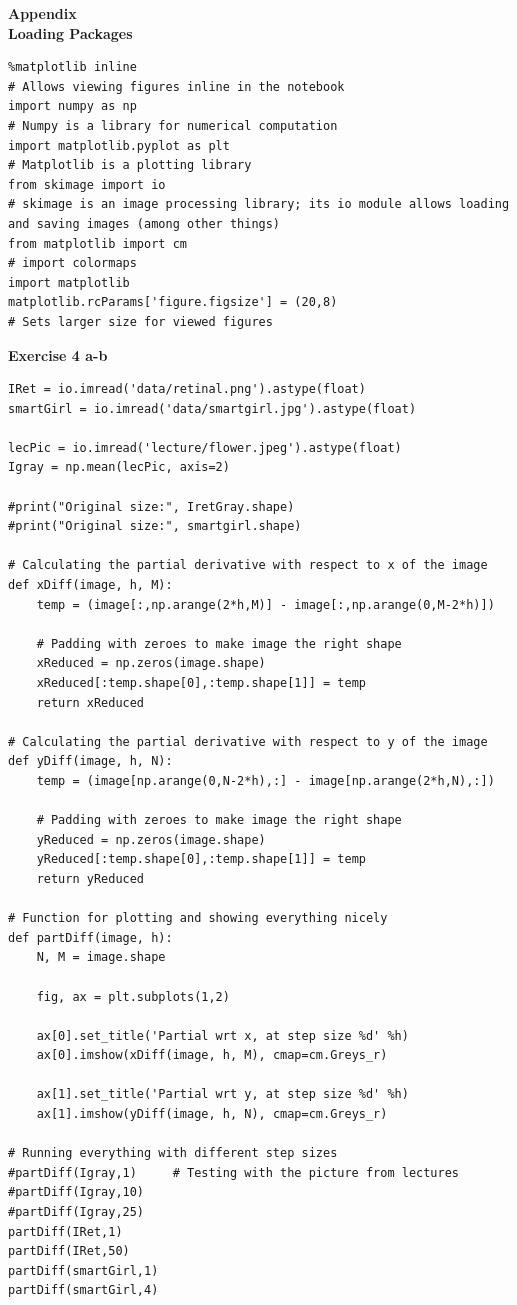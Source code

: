\newpage
\textbf{Appendix}\\

\textbf{Loading Packages}
\begin{verbatim}
%matplotlib inline
# Allows viewing figures inline in the notebook
import numpy as np
# Numpy is a library for numerical computation
import matplotlib.pyplot as plt
# Matplotlib is a plotting library
from skimage import io
# skimage is an image processing library; its io module allows loading and saving images (among other things)
from matplotlib import cm
# import colormaps
import matplotlib
matplotlib.rcParams['figure.figsize'] = (20,8)
# Sets larger size for viewed figures
\end{verbatim}

\textbf{Exercise 4 a-b}
\begin{verbatim}
IRet = io.imread('data/retinal.png').astype(float)
smartGirl = io.imread('data/smartgirl.jpg').astype(float)

lecPic = io.imread('lecture/flower.jpeg').astype(float)
Igray = np.mean(lecPic, axis=2) 

#print("Original size:", IretGray.shape)
#print("Original size:", smartgirl.shape)

# Calculating the partial derivative with respect to x of the image
def xDiff(image, h, M):
    temp = (image[:,np.arange(2*h,M)] - image[:,np.arange(0,M-2*h)])
    
    # Padding with zeroes to make image the right shape
    xReduced = np.zeros(image.shape)
    xReduced[:temp.shape[0],:temp.shape[1]] = temp
    return xReduced

# Calculating the partial derivative with respect to y of the image
def yDiff(image, h, N):
    temp = (image[np.arange(0,N-2*h),:] - image[np.arange(2*h,N),:])
    
    # Padding with zeroes to make image the right shape
    yReduced = np.zeros(image.shape)
    yReduced[:temp.shape[0],:temp.shape[1]] = temp
    return yReduced

# Function for plotting and showing everything nicely
def partDiff(image, h):
    N, M = image.shape 
    
    fig, ax = plt.subplots(1,2)
    
    ax[0].set_title('Partial wrt x, at step size %d' %h)
    ax[0].imshow(xDiff(image, h, M), cmap=cm.Greys_r)
    
    ax[1].set_title('Partial wrt y, at step size %d' %h)
    ax[1].imshow(yDiff(image, h, N), cmap=cm.Greys_r)
    
# Running everything with different step sizes
#partDiff(Igray,1)     # Testing with the picture from lectures
#partDiff(Igray,10)
#partDiff(Igray,25)
partDiff(IRet,1)
partDiff(IRet,50)
partDiff(smartGirl,1)
partDiff(smartGirl,4)
\end{verbatim}

